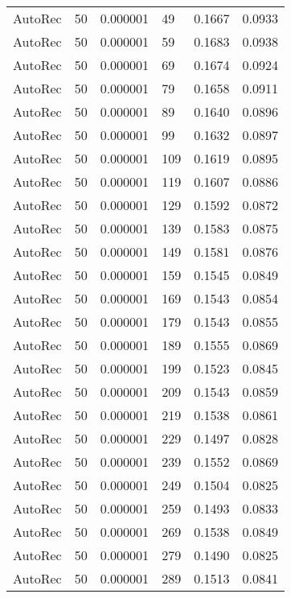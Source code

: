 \begin{tabular}{llrlrr}
 AutoRec &   50 &  0.000001 &    49 &  0.1667 &       0.0933 \\
 AutoRec &   50 &  0.000001 &    59 &  0.1683 &       0.0938 \\
 AutoRec &   50 &  0.000001 &    69 &  0.1674 &       0.0924 \\
 AutoRec &   50 &  0.000001 &    79 &  0.1658 &       0.0911 \\
 AutoRec &   50 &  0.000001 &    89 &  0.1640 &       0.0896 \\
 AutoRec &   50 &  0.000001 &    99 &  0.1632 &       0.0897 \\
 AutoRec &   50 &  0.000001 &   109 &  0.1619 &       0.0895 \\
 AutoRec &   50 &  0.000001 &   119 &  0.1607 &       0.0886 \\
 AutoRec &   50 &  0.000001 &   129 &  0.1592 &       0.0872 \\
 AutoRec &   50 &  0.000001 &   139 &  0.1583 &       0.0875 \\
 AutoRec &   50 &  0.000001 &   149 &  0.1581 &       0.0876 \\
 AutoRec &   50 &  0.000001 &   159 &  0.1545 &       0.0849 \\
 AutoRec &   50 &  0.000001 &   169 &  0.1543 &       0.0854 \\
 AutoRec &   50 &  0.000001 &   179 &  0.1543 &       0.0855 \\
 AutoRec &   50 &  0.000001 &   189 &  0.1555 &       0.0869 \\
 AutoRec &   50 &  0.000001 &   199 &  0.1523 &       0.0845 \\
 AutoRec &   50 &  0.000001 &   209 &  0.1543 &       0.0859 \\
 AutoRec &   50 &  0.000001 &   219 &  0.1538 &       0.0861 \\
 AutoRec &   50 &  0.000001 &   229 &  0.1497 &       0.0828 \\
 AutoRec &   50 &  0.000001 &   239 &  0.1552 &       0.0869 \\
 AutoRec &   50 &  0.000001 &   249 &  0.1504 &       0.0825 \\
 AutoRec &   50 &  0.000001 &   259 &  0.1493 &       0.0833 \\
 AutoRec &   50 &  0.000001 &   269 &  0.1538 &       0.0849 \\
 AutoRec &   50 &  0.000001 &   279 &  0.1490 &       0.0825 \\
 AutoRec &   50 &  0.000001 &   289 &  0.1513 &       0.0841 \\

\end{tabular}
